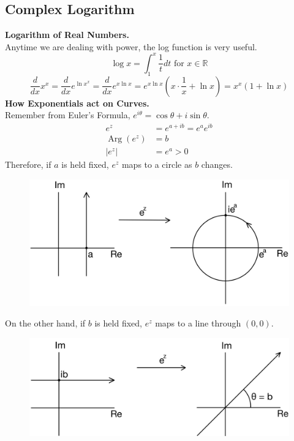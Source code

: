 \documentclass[11pt]{article}
\begin{document}
\subsection{Complex Logarithm}
\textbf{Logarithm of Real Numbers.} \\
Anytime we are dealing with power, the log function is very useful. 
\begin{equation*}
\log{x} = \int_{1}^{x} \frac{1}{t} dt \mbox{ for } x \in \mathbb{R}
\end{equation*}
$$\frac{d}{dx}x^x = \frac{d}{dx}e^{\ln{x^x}} = \frac{d}{dx}e^{x\ln x} = e^{x\ln x}\left(x \cdot \frac{1}{x} + \ln{x}\right) = x^x(1 + \ln{x})$$
\newline
\textbf{How Exponentials act on Curves.} \\
Remember from Euler's Formula, $e^{i\theta}= \cos\theta + i\sin\theta$. 
\begin{align*}
e^z &= e^{a + ib} = e^ae^{ib} \\
\operatorname{Arg}(e^z) &= b \\
|e^z| &= e^a > 0
\end{align*}
Therefore, if $a$ is held fixed, $e^z$ maps to a circle as $b$ changes. \\
\begin{figure}[H]
\includegraphics[scale = 0.2]{3_3}
\centering
\end{figure}
On the other hand, if $b$ is held fixed, $e^z$ maps to a line through $(0, 0)$. \\
\begin{figure}[H]
\includegraphics[scale = 0.2]{3_4}
\centering
\end{figure}
\end{document}
